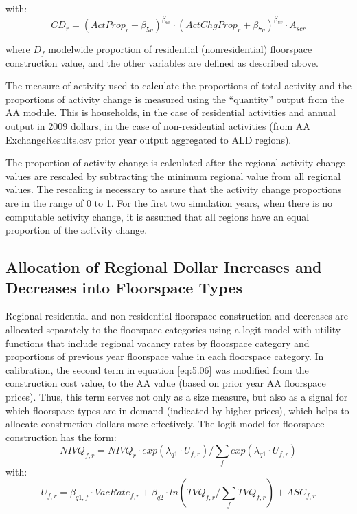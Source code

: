 \noindent with:
\begin{equation}  %
CD_r = (ActProp_r + \beta_{5v})^{\beta_{6v}} \cdot (ActChgProp_r + \beta_{7v})^{\beta_{8v}} \cdot A_{scr}
\end{equation}

\noindent where $D_f$ modelwide proportion of residential (nonresidential) floorspace construction value, and the other variables are defined as described above.

The measure of activity used to calculate the proportions of total activity and the proportions of activity change is measured using the ``quantity'' output from the AA module. This is households, in the case of residential activities and annual output in 2009 dollars, in the case of non-residential activities (from AA ExchangeResults.csv prior year output aggregated to ALD regions).

The proportion of activity change is calculated after the regional activity change values are rescaled by subtracting the minimum regional value from all regional values. The rescaling is necessary to assure that the activity change proportions are in the range of 0 to 1. For the first two simulation years, when there is no computable activity change, it is assumed that all regions have an equal proportion of the activity change.


\subsection{Allocation of Regional Dollar Increases and Decreases into Floorspace Types}\label{sec:ald-step2}   %
Regional residential and non-residential floorspace construction and decreases are allocated separately to the floorspace categories using a logit model with utility functions that include regional vacancy rates by floorspace category and proportions of previous year floorspace value in each floorspace category. In calibration, the second term in equation \ref{eq:5.06} was modified from the construction cost value, to the AA value (based on prior year AA floorspace prices). Thus, this term serves not only as a size measure, but also as a signal for which floorspace types are in demand (indicated by higher prices), which helps to allocate construction dollars more effectively. The logit model for floorspace construction has the form:
\begin{equation}\label{eq:5.05}   %
NIVQ_{f,r} = NIVQ_r \cdot exp(\lambda_{q1} \cdot U_{f,r}) / \sum_f exp(\lambda_{q1} \cdot U_{f,r})
\end{equation}
\noindent with:
\begin{equation}  %
U_{f,r} = {\beta_{q1,f}} \cdot VacRate_{f,r} + {\beta_{q2}} \cdot ln \left( TVQ_{f,r} / \sum_f TVQ_{f,r} \right) + ASC_{f,r}
\label{eq:5.06}
\end{equation}

